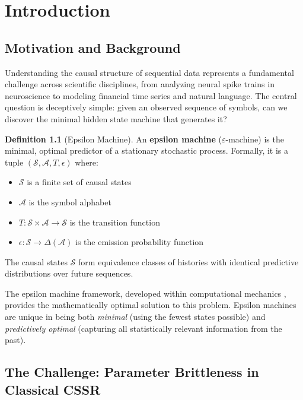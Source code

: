 \documentclass[11pt,a4paper]{report}
\newcommand{\epsmachine}{\varepsilon}
\newcommand{\states}{\mathcal{S}}
\newcommand{\alphabet}{\mathcal{A}}
\theoremstyle{definition}
\newtheorem{definition}{Definition}[chapter]
\begin{document}
\chapter{Introduction}
\label{ch:introduction}

\section{Motivation and Background}
\label{sec:motivation}

Understanding the causal structure of sequential data represents a fundamental challenge across scientific disciplines, from analyzing neural spike trains in neuroscience to modeling financial time series and natural language. The central question is deceptively simple: given an observed sequence of symbols, can we discover the minimal hidden state machine that generates it?

\begin{definition}[Epsilon Machine]
\label{def:epsilon-machine}
An \textbf{epsilon machine} ($\epsmachine$-machine) is the minimal, optimal predictor of a stationary stochastic process. Formally, it is a tuple $(\states, \alphabet, T, \epsilon)$ where:
\begin{itemize}
    \item $\states$ is a finite set of causal states
    \item $\alphabet$ is the symbol alphabet
    \item $T: \states \times \alphabet \rightarrow \states$ is the transition function
    \item $\epsilon: \states \rightarrow \Delta(\alphabet)$ is the emission probability function
\end{itemize}
The causal states $\states$ form equivalence classes of histories with identical predictive distributions over future sequences.
\end{definition}

The epsilon machine framework, developed within computational mechanics \cite{crutchfield1989, shalizi2001}, provides the mathematically optimal solution to this problem. Epsilon machines are unique in being both \textit{minimal} (using the fewest states possible) and \textit{predictively optimal} (capturing all statistically relevant information from the past).

\section{The Challenge: Parameter Brittleness in Classical CSSR}
\label{sec:challenge}
\end{document}
